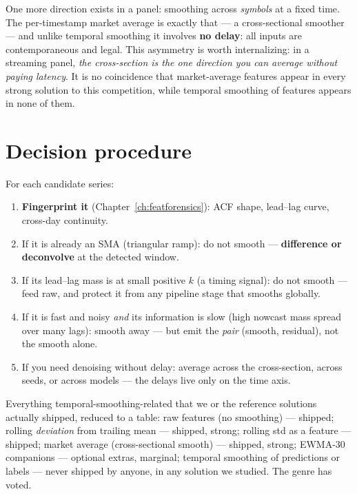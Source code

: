 One more direction exists in a panel: smoothing across \emph{symbols} at a
fixed time. The per-timestamp market average is exactly that --- a
cross-sectional smoother --- and unlike temporal smoothing it involves
\textbf{no delay}: all inputs are contemporaneous and legal. This asymmetry
is worth internalizing: in a streaming panel, \emph{the cross-section is
the one direction you can average without paying latency}. It is no
coincidence that market-average features appear in every strong solution
to this competition, while temporal smoothing of features appears in none
of them.

\section{Decision procedure}

For each candidate series:

\begin{enumerate}
\item \textbf{Fingerprint it} (Chapter~\ref{ch:featforensics}): ACF shape,
  lead--lag curve, cross-day continuity.
\item If it is already an SMA (triangular ramp): do not smooth ---
  \textbf{difference or deconvolve} at the detected window.
\item If its lead--lag mass is at small positive $k$ (a timing signal):
  do not smooth --- feed raw, and protect it from any pipeline stage that
  smooths globally.
\item If it is fast and noisy \emph{and} its information is slow (high
  nowcast mass spread over many lags): smooth away --- but emit the
  \emph{pair} (smooth, residual), not the smooth alone.
\item If you need denoising without delay: average across the
  cross-section, across seeds, or across models --- the delays live only
  on the time axis.
\end{enumerate}

\begin{jsbox}
Everything temporal-smoothing-related that we or the reference solutions
actually shipped, reduced to a table:
raw features (no smoothing) --- shipped;
rolling \emph{deviation} from trailing mean --- shipped, strong;
rolling std as a feature --- shipped;
market average (cross-sectional smooth) --- shipped, strong;
EWMA-30 companions --- optional extras, marginal;
temporal smoothing of predictions or labels --- never shipped by anyone,
in any solution we studied. The genre has voted.
\end{jsbox}

